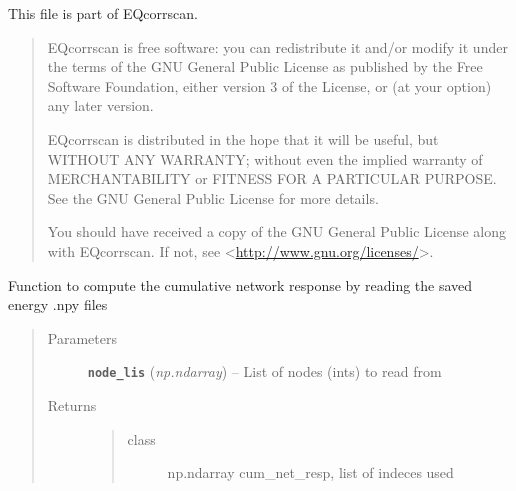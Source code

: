 \documentclass[a4paper,10pt,english]{sphinxmanual}
\begin{document}
This file is part of EQcorrscan.
\begin{quote}

EQcorrscan is free software: you can redistribute it and/or modify
it under the terms of the GNU General Public License as published by
the Free Software Foundation, either version 3 of the License, or
(at your option) any later version.

EQcorrscan is distributed in the hope that it will be useful,
but WITHOUT ANY WARRANTY; without even the implied warranty of
MERCHANTABILITY or FITNESS FOR A PARTICULAR PURPOSE.  See the
GNU General Public License for more details.

You should have received a copy of the GNU General Public License
along with EQcorrscan.  If not, see \textless{}\href{http://www.gnu.org/licenses/}{http://www.gnu.org/licenses/}\textgreater{}.
\end{quote}

\begin{fulllineitems}
\label{core:bright_lights._cum_net_resp}
Function to compute the cumulative network response by reading the saved
energy .npy files
\begin{quote}\begin{description}
\item[{Parameters}] \leavevmode
\textbf{\texttt{node\_lis}} (\emph{np.ndarray}) -- List of nodes (ints) to read from

\item[{Returns}] \leavevmode
\begin{quote}\begin{description}
\item[{class}] \leavevmode
np.ndarray cum\_net\_resp, list of indeces used

\end{description}\end{quote}


\end{description}\end{quote}

\end{fulllineitems}

\end{document}
